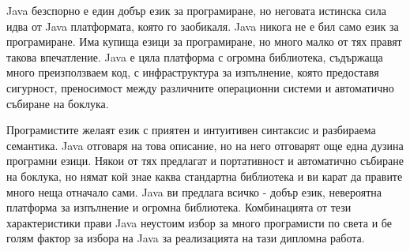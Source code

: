 Java безспорно е един добър език за програмиране, но неговата истинска
сила идва от Java платформата, която го заобикаля. Java никога не е
бил само език за програмиране. Има купища езици за програмиране, но
много малко от тях правят такова впечатление. Java е цяла платформа с
огромна библиотека, съдържаща много преизползваем код, с
инфраструктура за изпълнение, която предоставя сигурност, преносимост
между различните операционни системи и автоматично събиране на
боклука.

Програмистите желаят език с приятен и интуитивен синтаксис и
разбираема семантика. Java отговаря на това описание, но на него
отговарят още една дузина програмни езици. Някои от тях предлагат и
портативност и автоматично събиране на боклука, но нямат кой знае
каква стандартна библиотека и ви карат да правите много неща отначало
сами. Java ви предлага всичко - добър език, невероятна платформа за
изпълнение и огромна библиотека. Комбинацията от тези характеристики
прави Java неустоим избор за много програмисти по света и бе голям
фактор за избора на Java за реализацията на тази дипломна работа. 
